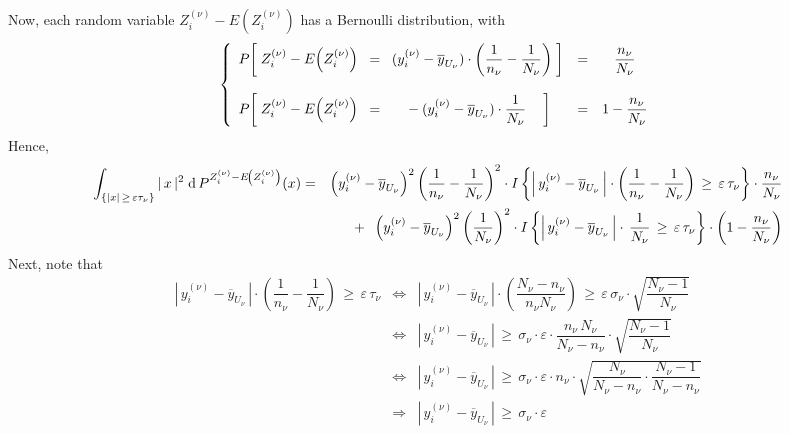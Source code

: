 Now, each random variable $Z^{(\nu)}_{i} - E\!\left(Z^{(\nu)}_{i}\right)$ has a Bernoulli distribution, with
\begin{equation*}
\left\{
\begin{array}{lcc}
P\!\left[\;
Z^{(\nu)}_{i} - E\!\left(Z^{(\nu)}_{i}\right) \;\;=\;\; (y^{(\nu)}_{i} - \overline{y}_{U_{\nu}})\cdot\left(\dfrac{1}{n_{\nu}} - \dfrac{1}{N_{\nu}}\right)
\;\right]
& = & \dfrac{n_{\nu}}{N_{\nu}}
\\ \\
P\!\left[\;
Z^{(\nu)}_{i} - E\!\left(Z^{(\nu)}_{i}\right) \;\;=\;\;
{\color{white}??}
-(y^{(\nu)}_{i} - \overline{y}_{U_{\nu}})\cdot\dfrac{1}{N_{\nu}}
{\color{white}??}\;\right]
& = & 1 - \dfrac{n_{\nu}}{N_{\nu}}
\end{array}
\right.
\end{equation*}
Hence,
\begin{eqnarray*}
\int_{\left\{\vert x\vert \,\geq\, \varepsilon\tau_{\nu}\right\}}
\vert\,x\,\vert^{2}\;
\textnormal{d}\,P^{Z^{(\nu)}_{i} - E\!\left(Z^{(\nu)}_{i}\right)}(x)
&=&
\left(y^{(\nu)}_{i} - \overline{y}_{U_{\nu}}\right)^{2}\left(\dfrac{1}{n_{\nu}} - \dfrac{1}{N_{\nu}}\right)^{2} \cdot
I\left\{
\left\vert\,y^{(\nu)}_{i} - \overline{y}_{U_{\nu}}\,\right\vert
\cdot
\left(\frac{1}{n_{\nu}} - \frac{1}{N_{\nu}}\right)
\,\geq\,\varepsilon\,\tau_{\nu}
\right\}
\cdot
\dfrac{n_{\nu}}{N_{\nu}}
\\
&&
+\;\;
\left(y^{(\nu)}_{i} - \overline{y}_{U_{\nu}}\right)^{2}\left(\dfrac{1}{N_{\nu}}\right)^{2} \cdot
I\left\{
\left\vert\,y^{(\nu)}_{i} - \overline{y}_{U_{\nu}}\,\right\vert
\cdot\,
\frac{1}{N_{\nu}}
\,\geq\,\varepsilon\,\tau_{\nu}
\right\}
\cdot
\left(1 - \dfrac{n_{\nu}}{N_{\nu}}\right)
\end{eqnarray*}
Next, note that
\begin{eqnarray*}
\left\vert\,y^{(\nu)}_{i} - \overline{y}_{U_{\nu}}\,\right\vert
\cdot
\left(\dfrac{1}{n_{\nu}} - \dfrac{1}{N_{\nu}}\right)
\,\geq\,\varepsilon\,\tau_{\nu}
&\Longleftrightarrow&
\left\vert\,y^{(\nu)}_{i} - \overline{y}_{U_{\nu}}\,\right\vert
\cdot
\left(\dfrac{N_{\nu} - n_{\nu}}{n_{\nu}N_{\nu}}\right)
\,\geq\,\varepsilon\,\sigma_{\nu}
\cdot
\sqrt{\dfrac{N_{\nu}-1}{N_{\nu}}}
\\
&\Longleftrightarrow&
\left\vert\,y^{(\nu)}_{i} - \overline{y}_{U_{\nu}}\,\right\vert
\,\geq\,
\sigma_{\nu}\cdot\varepsilon
\cdot
\dfrac{n_{\nu}\,N_{\nu}}{N_{\nu} - n_{\nu}}
\cdot
\sqrt{\dfrac{N_{\nu}-1}{N_{\nu}}}
\\
&\Longleftrightarrow&
\left\vert\,y^{(\nu)}_{i} - \overline{y}_{U_{\nu}}\,\right\vert
\,\geq\,
\sigma_{\nu}\cdot\varepsilon
\cdot n_{\nu} \cdot
\sqrt{\dfrac{N_{\nu}}{N_{\nu} - n_{\nu}}\cdot\dfrac{N_{\nu}-1}{N_{\nu} - n_{\nu}}}
\\
&\Longrightarrow&
\left\vert\,y^{(\nu)}_{i} - \overline{y}_{U_{\nu}}\,\right\vert
\,\geq\,
\sigma_{\nu}\cdot\varepsilon
\end{eqnarray*}
